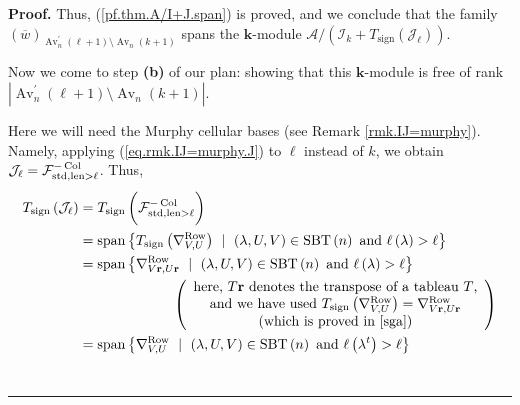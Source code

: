 \documentclass[numbers=enddot,12pt,final,onecolumn,notitlepage]{scrartcl}%
\numberwithin{exer}{subsection}
\theoremstyle{definition}
\newenvironment{proof}[1][Proof]{\noindent\textbf{#1.} }{\ \rule{0.5em}{0.5em}}
\newcommand{\MurpF}{\vphantom{\int_g^g}\mathcal{F}}
\begin{document}
\begin{proof}
Thus, (\ref{pf.thm.A/I+J.span}) is proved, and we conclude that the family
$\left(  \overline{w}\right)  _{\operatorname*{Av}\nolimits_{n}^{\prime
}\left(  \ell+1\right)  \setminus\operatorname*{Av}\nolimits_{n}\left(
k+1\right)  }$ spans the $\mathbf{k}$-module $\mathcal{A}/\left(
\mathcal{I}_{k}+T_{\operatorname*{sign}}\left(  \mathcal{J}_{\ell}\right)
\right)  $.

Now we come to step \textbf{(b)} of our plan: showing that this $\mathbf{k}%
$-module is free of rank $\left\vert \operatorname*{Av}\nolimits_{n}^{\prime
}\left(  \ell+1\right)  \setminus\operatorname*{Av}\nolimits_{n}\left(
k+1\right)  \right\vert $.

Here we will need the Murphy cellular bases (see Remark \ref{rmk.IJ=murphy}).
Namely, applying (\ref{eq.rmk.IJ=murphy.J}) to $\ell$ instead of $k$, we
obtain $\mathcal{J}_{\ell}=\MurpF_{\operatorname*{std},\operatorname*{len}%
>\ell}^{-\operatorname*{Col}}$. Thus,%
\begin{align*}
T_{\operatorname*{sign}}\left(  \mathcal{J}_{\ell}\right)   &
=T_{\operatorname*{sign}}\left(  \MurpF_{\operatorname*{std}%
,\operatorname*{len}>\ell}^{-\operatorname*{Col}}\right) \\
&  =\operatorname*{span}\left\{  T_{\operatorname*{sign}}\left(  \nabla
_{V,U}^{\operatorname*{Row}}\right)  \ \mid\ \left(  \lambda,U,V\right)
\in\operatorname*{SBT}\left(  n\right)  \text{ and }\ell\left(  \lambda
\right)  >\ell\right\} \\
&  =\operatorname*{span}\left\{  \nabla_{V\mathbf{r},U\mathbf{r}%
}^{\operatorname*{Row}}\ \mid\ \left(  \lambda,U,V\right)  \in
\operatorname*{SBT}\left(  n\right)  \text{ and }\ell\left(  \lambda\right)
>\ell\right\} \\
&  \ \ \ \ \ \ \ \ \ \ \ \ \ \ \ \ \ \ \ \ \left(
\begin{array}
[c]{c}%
\text{here, }T\mathbf{r}\text{ denotes the transpose of a tableau }T\text{,}\\
\text{and we have used }T_{\operatorname*{sign}}\left(  \nabla_{V,U}%
^{\operatorname*{Row}}\right)  =\nabla_{V\mathbf{r},U\mathbf{r}}%
^{\operatorname*{Row}}\\
\text{(which is proved in \cite[Proposition 6.8.12]{sga})}%
\end{array}
\right) \\
&  =\operatorname*{span}\left\{  \nabla_{V,U}^{\operatorname*{Row}}%
\ \mid\ \left(  \lambda,U,V\right)  \in\operatorname*{SBT}\left(  n\right)
\text{ and }\ell\left(  \lambda^{t}\right)  >\ell\right\} \\

\end{align*}
\end{proof}
\end{document}
